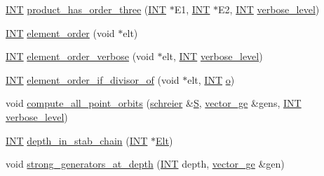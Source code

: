 \begin{DoxyCompactItemize}
\item 
\mbox{\hyperlink{galois_8h_a09fddde158a3a20bd2dcadb609de11dc}{I\+NT}} \mbox{\hyperlink{classaction_a92cfbcef9ad53841cffb3fdad0dd7ab8}{product\+\_\+has\+\_\+order\+\_\+three}} (\mbox{\hyperlink{galois_8h_a09fddde158a3a20bd2dcadb609de11dc}{I\+NT}} $\ast$E1, \mbox{\hyperlink{galois_8h_a09fddde158a3a20bd2dcadb609de11dc}{I\+NT}} $\ast$E2, \mbox{\hyperlink{galois_8h_a09fddde158a3a20bd2dcadb609de11dc}{I\+NT}} \mbox{\hyperlink{simeon_8_c_a818073fbcc2f439e7c56952f67386122}{verbose\+\_\+level}})
\item 
\mbox{\hyperlink{galois_8h_a09fddde158a3a20bd2dcadb609de11dc}{I\+NT}} \mbox{\hyperlink{classaction_a50046bf5383ee5febe5a882677626d34}{element\+\_\+order}} (void $\ast$elt)
\item 
\mbox{\hyperlink{galois_8h_a09fddde158a3a20bd2dcadb609de11dc}{I\+NT}} \mbox{\hyperlink{classaction_add2dfd7b5222e51853d8f8dfd53eb95d}{element\+\_\+order\+\_\+verbose}} (void $\ast$elt, \mbox{\hyperlink{galois_8h_a09fddde158a3a20bd2dcadb609de11dc}{I\+NT}} \mbox{\hyperlink{simeon_8_c_a818073fbcc2f439e7c56952f67386122}{verbose\+\_\+level}})
\item 
\mbox{\hyperlink{galois_8h_a09fddde158a3a20bd2dcadb609de11dc}{I\+NT}} \mbox{\hyperlink{classaction_af8ef092c60060fa6201845ee86cbc9c5}{element\+\_\+order\+\_\+if\+\_\+divisor\+\_\+of}} (void $\ast$elt, \mbox{\hyperlink{galois_8h_a09fddde158a3a20bd2dcadb609de11dc}{I\+NT}} \mbox{\hyperlink{alphabet2_8_c_a8198753dd743101d6583a27b1454fc4a}{o}})
\item 
void \mbox{\hyperlink{classaction_a8fc64d7994aa7e5eee96eedf6be3215e}{compute\+\_\+all\+\_\+point\+\_\+orbits}} (\mbox{\hyperlink{classschreier}{schreier}} \&\mbox{\hyperlink{simeon_8_c_adab47f8243f1b5a2c31df2535d6b37d0}{S}}, \mbox{\hyperlink{classvector__ge}{vector\+\_\+ge}} \&gens, \mbox{\hyperlink{galois_8h_a09fddde158a3a20bd2dcadb609de11dc}{I\+NT}} \mbox{\hyperlink{simeon_8_c_a818073fbcc2f439e7c56952f67386122}{verbose\+\_\+level}})
\item 
\mbox{\hyperlink{galois_8h_a09fddde158a3a20bd2dcadb609de11dc}{I\+NT}} \mbox{\hyperlink{classaction_a10b3912651ec1f73a5b1f2f4bc1f4fd2}{depth\+\_\+in\+\_\+stab\+\_\+chain}} (\mbox{\hyperlink{galois_8h_a09fddde158a3a20bd2dcadb609de11dc}{I\+NT}} $\ast$\mbox{\hyperlink{simeon_8_c_aec1406935bdb1fee3561fcb840964100}{Elt}})
\item 
void \mbox{\hyperlink{classaction_a669cd686b88190d7ea71846466606a60}{strong\+\_\+generators\+\_\+at\+\_\+depth}} (\mbox{\hyperlink{galois_8h_a09fddde158a3a20bd2dcadb609de11dc}{I\+NT}} depth, \mbox{\hyperlink{classvector__ge}{vector\+\_\+ge}} \&gen)

\end{DoxyCompactItemize}
